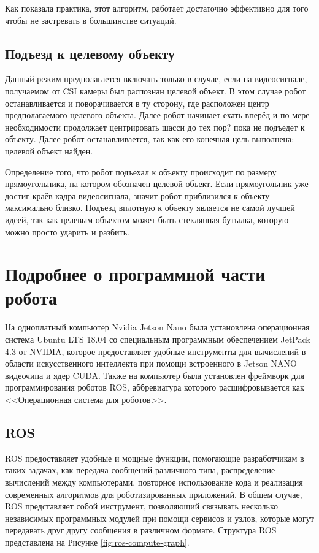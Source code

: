 Как показала практика, этот алгоритм, работает достаточно эффективно для того чтобы не застревать в большинстве ситуаций.

\subsection{Подъезд к целевому объекту}

Данный режим предполагается включать только в случае, если на видеосигнале, получаемом от CSI камеры был распознан целевой объект. В этом случае робот останавливается и поворачивается в ту сторону, где расположен центр предполагаемого целевого объекта. Далее робот начинает ехать вперёд и по мере необходимости продолжает центрировать шасси до тех пор? пока не подъедет к объекту. Далее робот останавливается, так как его конечная цель выполнена: целевой объект найден. 

Определение того, что робот подъехал к объекту происходит по размеру прямоугольника, на котором обозначен целевой объект. Если прямоугольник уже достиг краёв кадра видеосигнала, значит робот приблизился к объекту максимально близко. Подъезд вплотную к объекту является не самой лучшей идеей, так как целевым объектом может быть стеклянная бутылка, которую можно просто ударить и разбить.

\section{Подробнее о программной части робота}
На одноплатный компьютер Nvidia Jetson Nano была установлена операционная система Ubuntu LTS 18.04 со специальным программным обеспечением JetPack 4.3 от NVIDIA, которое предоставляет удобные инструменты для вычислений в области искусственного интеллекта при помощи встроенного в Jetson NANO видеочипа и ядер CUDA. Также на компьютер была установлен фреймворк для программирования роботов ROS, аббревиатура которого расшифровывается как <<Операционная система для роботов>>.

\subsection{ROS}
ROS предоставляет удобные и мощные функции, помогающие разработчикам в таких задачах, как передача сообщений различного типа, распределение вычислений между компьютерами, повторное использование кода и реализация современных алгоритмов для роботизированных приложений\cite[с. 7]{joseph2018mastering}. В общем случае, ROS представляет собой инструмент, позволяющий связывать несколько независимых программных модулей при помощи сервисов и узлов, которые могут передавать друг другу сообщения в различном формате. Структура ROS представлена на Рисунке \ref{fig:ros-compute-graph}\cite[с. 19]{joseph2018mastering}.

